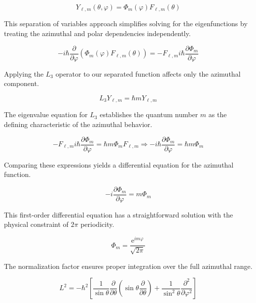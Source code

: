\begin{equation}
Y_{\ell, m}(\theta, \varphi)=\Phi_{m}(\varphi) F_{\ell, m}(\theta)
\end{equation}

This separation of variables approach simplifies solving for the eigenfunctions by treating the azimuthal and polar dependencies independently.

\begin{equation}
-i \hbar \frac{\partial}{\partial \varphi}\left(\Phi_{m}(\varphi) F_{\ell, m}(\theta)\right)=-F_{\ell, m} i \hbar \frac{\partial \Phi_{m}}{\partial \varphi}
\end{equation}

Applying the $L_3$ operator to our separated function affects only the azimuthal component.

\begin{equation}
L_{3} Y_{\ell, m}=\hbar m Y_{\ell, m}
\end{equation}

The eigenvalue equation for $L_3$ establishes the quantum number $m$ as the defining characteristic of the azimuthal behavior.

\begin{equation}
-F_{\ell, m} i \hbar \frac{\partial \Phi_{m}}{\partial \varphi}=\hbar m \Phi_{m} F_{\ell, m} \Longrightarrow-i \hbar \frac{\partial \Phi_{m}}{\partial \varphi}=\hbar m \Phi_{m}
\end{equation}

Comparing these expressions yields a differential equation for the azimuthal function.

\begin{equation}
-i \frac{\partial \Phi_{m}}{\partial \varphi}=m \Phi_{m}
\end{equation}

This first-order differential equation has a straightforward solution with the physical constraint of $2\pi$ periodicity.

\begin{equation}
\Phi_{m}=\frac{\mathrm{e}^{i m \varphi}}{\sqrt{2 \pi}}
\end{equation}

The normalization factor ensures proper integration over the full azimuthal range.

\begin{equation}
L^{2}=-\hbar^{2}\left[\frac{1}{\sin \theta} \frac{\partial}{\partial \theta}\left(\sin \theta \frac{\partial}{\partial \theta}\right)+\frac{1}{\sin ^{2} \theta} \frac{\partial^{2}}{\partial \varphi^{2}}\right]
\end{equation}

